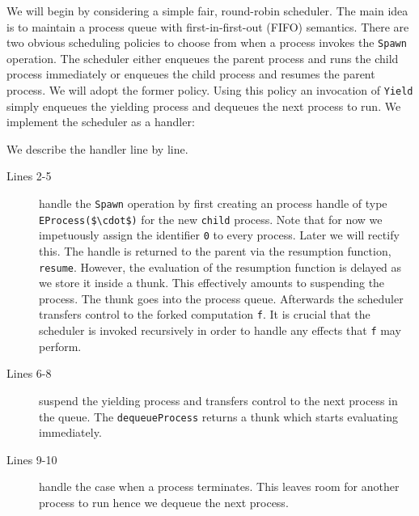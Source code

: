 \documentclass[12pt,mscres,cdtppar,twoside,openright,logo,rightchapter,normalheadings]{infthesis}
\theoremstyle{definition}
\begin{document}
We will begin by considering a simple fair, round-robin scheduler. The
main idea is to maintain a process queue with first-in-first-out
(FIFO) semantics.  There are two obvious scheduling policies to choose
from when a process invokes the \lstinline$Spawn$ operation. The
scheduler either enqueues the parent process and runs the child
process immediately or enqueues the child process and resumes the
parent process. We will adopt the former policy. Using this policy an
invocation of \lstinline$Yield$ simply enqueues the yielding process
and dequeues the next process to run. We implement the scheduler as a
handler:
%

%
We describe the handler line by line.
%
\begin{description}
\item[Lines 2-5] handle the \lstinline$Spawn$ operation by first
  creating an process handle of type
  \lstinline[mathescape]!EProcess($\cdot$)! for the new
  \lstinline$child$ process. Note that for now we impetuously assign
  the identifier \lstinline$0$ to every process. Later we will rectify
  this. The handle is returned to the parent via the resumption
  function, \lstinline$resume$. However, the evaluation of the
  resumption function is delayed as we store it inside a thunk.  This
  effectively amounts to suspending the process. The thunk goes into
  the process queue. Afterwards the scheduler transfers control to the
  forked computation \lstinline$f$. It is crucial that the scheduler
  is invoked recursively in order to handle any effects that
  \lstinline$f$ may perform.

\item[Lines 6-8] suspend the yielding process and transfers control to
  the next process in the queue. The \lstinline$dequeueProcess$
  returns a thunk which starts evaluating immediately.

\item[Lines 9-10] handle the case when a process terminates. This
  leaves room for another process to run hence we dequeue the next
  process.

\end{description}
%
\end{document}
